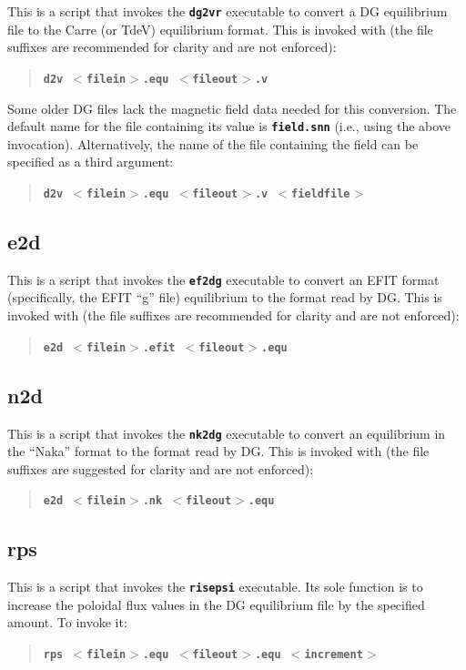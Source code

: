 \documentclass[12pt]{report}
\begin{document}
This is a script that invokes the \textbf{\texttt{dg2vr}} 
executable to convert a
DG equilibrium file to the Carre (or TdeV) equilibrium 
format.
This is invoked with (the file suffixes are recommended for clarity
and are not enforced):
\begin{quote}
\textbf{\texttt{d2v $<$filein$>$.equ $<$fileout$>$.v}}
\end{quote}
Some older DG files lack the magnetic field data needed for this conversion.
The default name for the file containing its value is 
\textbf{\texttt{field.snn}} (i.e., using the above invocation).  
Alternatively, the name of the file containing the field can be 
specified as a third argument:
\begin{quote}
\textbf{\texttt{d2v $<$filein$>$.equ $<$fileout$>$.v $<$fieldfile$>$}}
\end{quote}
\subsection{e2d}

This is a script that invokes the \textbf{\texttt{ef2dg}} 
executable to convert an EFIT format (specifically, the EFIT ``g'' file)
equilibrium to the format read by DG. 
This is invoked with (the file suffixes are recommended for clarity
and are not enforced):
\begin{quote}
\textbf{\texttt{e2d $<$filein$>$.efit $<$fileout$>$.equ}}
\end{quote}
\subsection{n2d}

This is a script that invokes the \textbf{\texttt{nk2dg}} 
executable to convert an equilibrium in the
``Naka'' format
to the format read by DG. 
This is invoked with (the file suffixes are suggested for clarity
and are not enforced):
\begin{quote}
\textbf{\texttt{e2d $<$filein$>$.nk $<$fileout$>$.equ}}
\end{quote}
\subsection{rps}

This is a script that invokes the \textbf{\texttt{risepsi}} executable. 
Its sole
function is to increase the poloidal flux values in the
DG equilibrium file by the specified amount.  To 
invoke it:
\begin{quote}
\textbf{\texttt{rps $<$filein$>$.equ $<$fileout$>$.equ $<$increment$>$}}
\end{quote}
\end{document}
